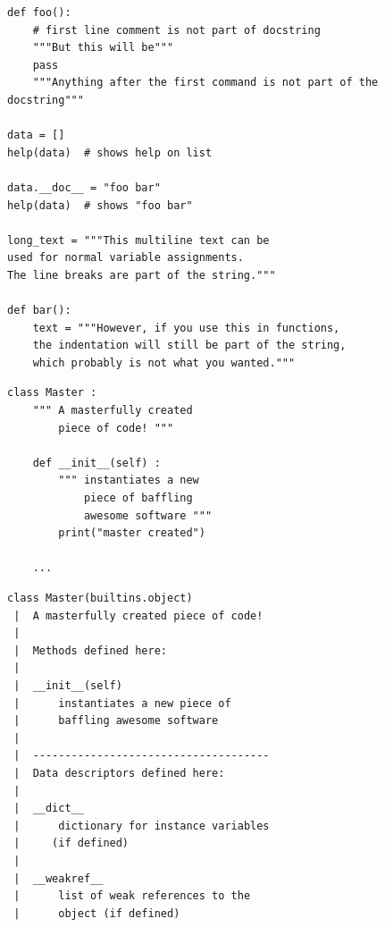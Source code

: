 
\begin{frame}[fragile]
%
\vspace{-3pt}
\begin{codebox}
\begin{verbatim}
def foo():
    # first line comment is not part of docstring
    """But this will be"""    
    pass
    """Anything after the first command is not part of the docstring"""

data = []
help(data)  # shows help on list

data.__doc__ = "foo bar"
help(data)  # shows "foo bar"

long_text = """This multiline text can be
used for normal variable assignments.
The line breaks are part of the string."""

def bar():
    text = """However, if you use this in functions,
    the indentation will still be part of the string,
    which probably is not what you wanted."""
\end{verbatim}
\end{codebox}
%
\end{frame}


\begin{frame}[fragile]
%
\begin{tcbraster}[raster columns=2,
                  raster equal height,
                  nobeforeafter,
                  raster column skip=0.5cm]
\begin{codebox}
\begin{verbatim}
class Master :
    """ A masterfully created
        piece of code! """
    
    def __init__(self) :
        """ instantiates a new
            piece of baffling
            awesome software """
        print("master created")
    
    ...
\end{verbatim}
\end{codebox}
%
\begin{cmdbox}
\begin{verbatim}
class Master(builtins.object)
 |  A masterfully created piece of code!
 |  
 |  Methods defined here:
 |  
 |  __init__(self)
 |      instantiates a new piece of
 |      baffling awesome software
 |  
 |  -------------------------------------
 |  Data descriptors defined here:
 |  
 |  __dict__
 |      dictionary for instance variables
 |     (if defined)
 |  
 |  __weakref__
 |      list of weak references to the
 |      object (if defined)
\end{verbatim}
\end{cmdbox}
\end{tcbraster}
%
\end{frame}


